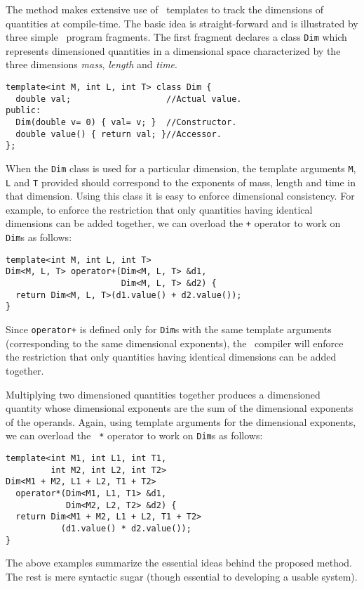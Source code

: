 The method makes extensive use of \cpp\ templates to track the
dimensions of quantities at compile-time.  The basic idea is
straight-forward and is illustrated by three simple \cpp\ program
fragments.  The first fragment declares a class {\tt Dim} which
represents dimensioned quantities in a dimensional space
characterized by the three dimensions {\em mass}, {\em length} and
{\em time}.
{\small
\begin{verbatim}
template<int M, int L, int T> class Dim {
  double val;                   //Actual value.
public:
  Dim(double v= 0) { val= v; }  //Constructor. 
  double value() { return val; }//Accessor.  
}; 
\end{verbatim} }
When the {\tt Dim} class is used for a particular dimension, the
template arguments {\tt M}, {\tt L} and {\tt T} provided should
correspond to the exponents of mass, length and time in that
dimension.  Using this class it is easy to enforce dimensional
consistency. For example, to enforce the restriction that only
quantities having identical dimensions can be added together, we
can overload the {\tt +} operator to work on {\tt Dim}s as
follows: 
{\small 
\begin{verbatim} 
template<int M, int L, int T>
Dim<M, L, T> operator+(Dim<M, L, T> &d1,
                       Dim<M, L, T> &d2) {
  return Dim<M, L, T>(d1.value() + d2.value());
}
\end{verbatim}
}
Since {\tt operator+} is defined only for {\tt Dim}s with the same
template arguments (corresponding to the same dimensional exponents),
the \cpp\ compiler will enforce the restriction that only
quantities having identical dimensions can be added together.

Multiplying two dimensioned quantities together produces a
dimensioned quantity whose dimensional exponents are the sum of
the dimensional exponents of the operands.  Again, using template
arguments for the dimensional exponents, we can overload the {\tt
*} operator to work on {\tt Dim}s as follows:
{\small
\begin{verbatim}
template<int M1, int L1, int T1, 
         int M2, int L2, int T2>
Dim<M1 + M2, L1 + L2, T1 + T2> 
  operator*(Dim<M1, L1, T1> &d1, 
            Dim<M2, L2, T2> &d2) {
  return Dim<M1 + M2, L1 + L2, T1 + T2>
           (d1.value() * d2.value());
}
\end{verbatim}
}

The above examples summarize the essential ideas behind the
proposed method.  The rest is mere syntactic sugar (though
essential to developing a usable system).

